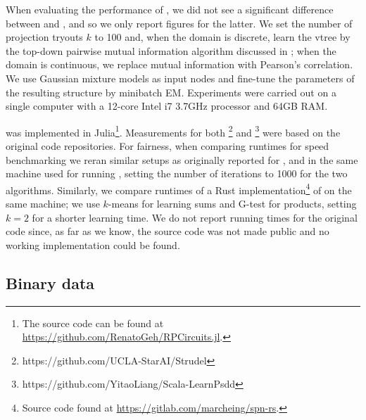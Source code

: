 When evaluating the performance of , we did not see a significant difference
between  and , and so we only report figures for the latter.
We set the number of projection tryouts $k$ to 100 and, when the domain is discrete, learn the
vtree by the top-down pairwise mutual information algorithm discussed in ; when
the domain is continuous, we replace mutual information with Pearson's correlation. We use Gaussian
mixture models as input nodes and fine-tune the parameters of the resulting structure by minibatch
EM. Experiments were carried out on a single computer with a 12-core Intel i7 3.7GHz processor and
64GB RAM.

 was implemented in Julia\footnote{The source code can be found at
\url{https://github.com/RenatoGeh/RPCircuits.jl}.}. Measurements for both
\footnote{https://github.com/UCLA-StarAI/Strudel} and
\footnote{https://github.com/YitaoLiang/Scala-LearnPsdd} were based on the
original code repositories. For fairness, when comparing runtimes for speed benchmarking we reran
similar setups as originally reported for ,  and
 in the same machine used for running , setting the number of
iterations to 1000 for the two \incrclass{} algorithms. Similarly, we compare runtimes of a Rust
implementation\footnote{Source code found at \url{https://gitlab.com/marcheing/spn-rs}.} of
 on the same machine; we use $k$-means for learning sums and G-test for
products, setting $k=2$ for a shorter learning time. We do not report running times for the
original  code since, as far as we know, the source code was not made public
and no working implementation could be found.

\subsection{Binary data}

